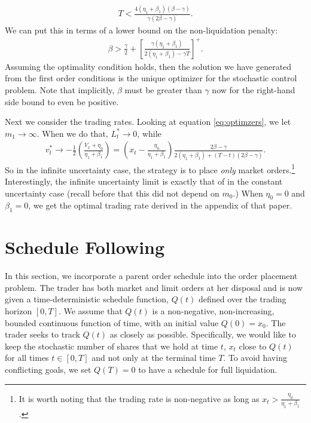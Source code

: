 \documentclass[12pt, letterpaper]{article}
\numberwithin{equation}{section}
\numberwithin{theorem}{section}
\begin{document}
\begin{equation}
\begin{aligned}
T<\frac{4(\eta_1+\beta_1)(\beta-\gamma)}{\gamma(2\beta-\gamma)}.
\end{aligned}
\end{equation}
We can put this in terms of a lower bound on the non-liquidation penalty:
\begin{equation*}
\begin{aligned}
\beta>\frac{\gamma}{2}+\left[\frac{\gamma(\eta_1+\beta_1)}{2(\eta_1+\beta_1)-\gamma T}\right]^+.
\end{aligned}
\end{equation*}
Assuming the optimality condition holds, then the solution we have generated from the first order conditions is the unique optimizer for the stochastic control problem. Note that implicitly, $\beta$ must be greater than $\gamma$ now for the right-hand side bound to even be positive.
 
Next we consider the trading rates. Looking at equation \eqref{eq:optimzers}, we let $m_1\rightarrow\infty$. When we do that, $L_t^*\rightarrow0$, while
\begin{equation}
\begin{aligned}
v_t^*\rightarrow-\frac{1}{2}\left(\frac{V_x+\eta_0}{\eta_1+\beta_1}\right)=\left(x_t-\frac{\eta_0}{\eta_1+\beta_1}\right)\frac{2\beta-\gamma}{2\left(\eta_1+\beta_1\right)+(T-t)\left(2\beta-\gamma\right)}. 
\end{aligned}
\end{equation}
So in the infinite uncertainty case, the strategy is to place \emph{only} market orders.\footnote{It is worth noting that the trading rate is non-negative as long as $x_t>\frac{\eta_0}{\eta_1+\beta_1}$.} Interestingly, the infinite uncertainty limit is exactly that of \cite{TaiHoACF} in the constant uncertainty case (recall before that this did not depend on $m_0$.) When $\eta_0=0$ and $\beta_1=0$, we get the optimal trading rate derived in the appendix of that paper. 


\section{Schedule Following}\label{sec:schedule_following}
In this section, we incorporate a parent order schedule into the order placement problem. The trader  has both market and limit orders at her disposal and is now given  a time-deterministic schedule function, $Q(t)$ defined over the trading horizon $[0,T]$. We assume that $Q(t)$ is a non-negative, non-increasing, bounded continuous function of time, with an initial value $Q(0)=x_0$.   The trader seeks to track $Q(t)$ as closely as possible. Specifically, we would like to keep the stochastic number of shares that we hold at time $t$, $x_t$ close to $Q(t)$ for all times $t\in[0,T]$ and not only at the terminal time $T$. To avoid having conflicting goals, we set $Q(T)=0$ to have a schedule for full liquidation. 
\end{document}
